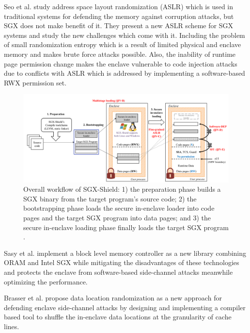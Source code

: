 Seo et al. \cite{sgxshield} study address space layout randomization (ASLR) which is used in traditional systems for defending the memory against corruption attacks, but SGX does not make benefit of it. They present a new ASLR scheme for SGX systems and study the new challenges which come with it. Including the problem of small randomization entropy which is a result of limited physical and enclave memory and makes brute force attacks possible. Also, the inability of runtime page permission change makes the enclave vulnerable to code injection attacks due to conflicts with ASLR which is addressed by implementing a software-based RWX permission set.

\begin{figure}
	\includegraphics[scale=0.2]{images/sgxshield}
	\caption{Overall workflow of SGX-Shield: 1) the preparation phase builds a SGX binary from the target program’s source code; 2) the bootstrapping phase loads the secure in-enclave loader into code pages and the target SGX program into data pages; and 3) the secure in-enclave loading phase finally loads the target SGX program \cite{sgxshield}.}
	\label{fig:sgxshield}
\end{figure}

Sasy et al. \cite{zerotrace} implement a block level memory controller as a new library combining ORAM \cite{oram1,oram2,oram3} and Intel SGX while mitigating the disadvantages of these technologies and protects the enclave from software-based side-channel attacks meanwhile optimizing the performance.

Brasser et al. \cite{drsgx} propose data location randomization as a new approach for defending enclave side-channel attacks by designing and implementing a compiler based tool to shuffle the in-enclave data locations at the granularity of cache lines.

